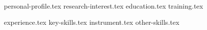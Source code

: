 \documentclass[letterpaper,11pt]{article}
\begin{document}


{personal-profile.tex}
{research-interest.tex}
{education.tex}
{training.tex}

\pagebreak

{experience.tex}
\sidebyside
    {{key-skills.tex}}
    {{instrument.tex}}
{other-skills.tex}
\end{document}
